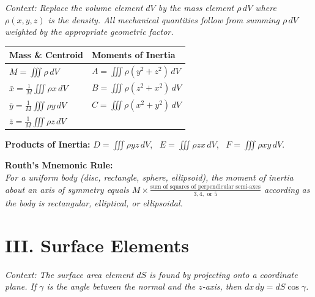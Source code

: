 \documentclass[11pt, a4paper]{article}
\begin{document}
\textit{\small Context: Replace the volume element $dV$ by the mass element $\rho\,dV$ where $\rho(x,y,z)$ is the density. All mechanical quantities follow from summing $\rho\,dV$ weighted by the appropriate geometric factor.}

\begin{center}
\begin{tabular}{@{}p{} p{}@{}}
\toprule
\textbf{Mass \& Centroid} & \textbf{Moments of Inertia} \\
\midrule
$M = \iiint \rho\,dV$ & $A = \iiint \rho(y^2+z^2)\,dV$ \\
$\bar{x} = \frac{1}{M}\iiint \rho x\,dV$ & $B = \iiint \rho(z^2+x^2)\,dV$ \\
$\bar{y} = \frac{1}{M}\iiint \rho y\,dV$ & $C = \iiint \rho(x^2+y^2)\,dV$ \\
$\bar{z} = \frac{1}{M}\iiint \rho z\,dV$ & \\
\bottomrule
\end{tabular}
\end{center}

\vspace{0.2cm}

\textbf{\color{accent}Products of Inertia:} $D = \iiint \rho yz\,dV$, \ $E = \iiint \rho zx\,dV$, \ $F = \iiint \rho xy\,dV$.

\vspace{0.2cm}

\textbf{\color{accent}Routh's Mnemonic Rule:}\\
\textit{\small For a uniform body (disc, rectangle, sphere, ellipsoid), the moment of inertia about an axis of symmetry equals $M \times \frac{\text{sum of squares of perpendicular semi-axes}}{3, 4, \text{ or } 5}$ according as the body is rectangular, elliptical, or ellipsoidal.}


\section*{\color{primary} III. Surface Elements}

\textit{\small Context: The surface area element $dS$ is found by projecting onto a coordinate plane. If $\gamma$ is the angle between the normal and the $z$-axis, then $dx\,dy = dS \cos\gamma$.}
\end{document}
